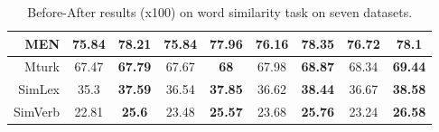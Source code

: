 \documentclass{article} \usepackage{acl2017,times}
\begin{document}
\begin{table}[!h]
\begin{tabular}{|r|c|c|c|c|c|c|c|c|}
MEN                      & 75.84  & \textbf{78.21}  & 75.84  & \textbf{77.96}  & 76.16  & \textbf{78.35}  & 76.72   & \textbf{78.1}   \\ \hline
Mturk                    & 67.47  & \textbf{67.79}  & 67.67  & \textbf{68}     & 67.98  & \textbf{68.87}  & 68.34   & \textbf{69.44}  \\ \hline
SimLex                   & 35.3   & \textbf{37.59}  & 36.54  & \textbf{37.85}  & 36.62  & \textbf{38.44}  & 36.67   & \textbf{38.58}  \\ \hline
SimVerb                  & 22.81  & \textbf{25.6}   & 23.48  & \textbf{25.57}  & 23.68  & \textbf{25.76}  & 23.24   & \textbf{26.58}  \\ \hline
\end{tabular}
\caption{Before-After results (x100) on word similarity task on seven datasets.}
\label{tb:high-dim-similarity}
\end{table}
\end{document}

